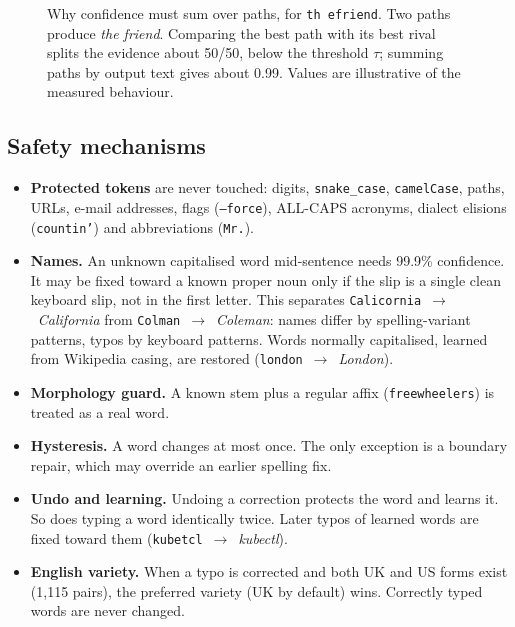 \documentclass[11pt,a4paper]{article}
\newcommand{\ttw}[1]{\texttt{#1}}
\begin{document}
\begin{figure}[t]
\centering
{}
\caption{Why confidence must sum over paths, for \ttw{th efriend}. Two paths produce \emph{the friend}. Comparing the best path with its best rival splits the evidence about 50/50, below the threshold $\tau$; summing paths by output text gives about 0.99. Values are illustrative of the measured behaviour.}
\label{fig:pathsum}
\end{figure}

\subsection{Safety mechanisms}
\label{sec:safety}
\begin{itemize}
\item \textbf{Protected tokens} are never touched: digits, \ttw{snake\_case}, \ttw{camelCase}, paths, URLs, e-mail addresses, flags (\ttw{--force}), ALL-CAPS acronyms, dialect elisions (\ttw{countin'}) and abbreviations (\ttw{Mr.}).
\item \textbf{Names.} An unknown capitalised word mid-sentence needs 99.9\% confidence. It may be fixed toward a known proper noun only if the slip is a single clean keyboard slip, not in the first letter. This separates \ttw{Calicornia}~$\to$~\emph{California} from \ttw{Colman}~$\to$~\emph{Coleman}: names differ by spelling-variant patterns, typos by keyboard patterns. Words normally capitalised, learned from Wikipedia casing, are restored (\ttw{london}~$\to$~\emph{London}).
\item \textbf{Morphology guard.} A known stem plus a regular affix (\ttw{freewheelers}) is treated as a real word.
\item \textbf{Hysteresis.} A word changes at most once. The only exception is a boundary repair, which may override an earlier spelling fix.
\item \textbf{Undo and learning.} Undoing a correction protects the word and learns it. So does typing a word identically twice. Later typos of learned words are fixed toward them (\ttw{kubetcl}~$\to$~\emph{kubectl}).
\item \textbf{English variety.} When a typo is corrected and both UK and US forms exist (1,115 pairs), the preferred variety (UK by default) wins. Correctly typed words are never changed.
\end{itemize}
\end{document}
